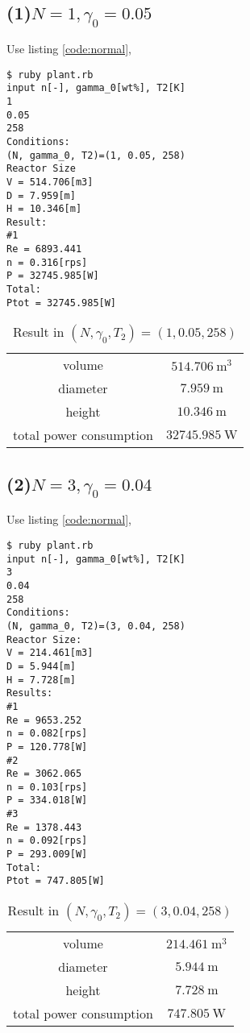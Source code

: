 \documentclass[a4paper,titlepage]{article}
\begin{document}
  \subsection*{(1)$N=1, \gamma_0=0.05$}
  Use listing \ref{code:normal},
  \begin{screen}
    \begin{verbatim}
$ ruby plant.rb
input n[-], gamma_0[wt%], T2[K]
1
0.05
258
Conditions:
(N, gamma_0, T2)=(1, 0.05, 258)
Reactor Size
V = 514.706[m3]
D = 7.959[m]
H = 10.346[m]
Result:
#1
Re = 6893.441
n = 0.316[rps]
P = 32745.985[W]
Total:
Ptot = 32745.985[W]\end{verbatim}
  \end{screen}

  \begin{table}[htbp]
    \centering
    \begin{tabular}{cc}\hline
      volume & $\SI{514.706}{\cubic\meter}$ \\
      diameter & $\SI{7.959}{\meter}$ \\
      height & $\SI{10.346}{\meter}$ \\
      total power consumption & $\SI{32745.985}{\watt}$ \\ \hline
    \end{tabular}
    \caption{Result in $(N, \gamma_0, T_2) = (1, 0.05, 258)$}
  \end{table}

\newpage

  \subsection*{(2)$N=3, \gamma_0=0.04$}
  Use listing \ref{code:normal},
  \begin{screen}
    \begin{verbatim}
$ ruby plant.rb
input n[-], gamma_0[wt%], T2[K]
3
0.04
258
Conditions:
(N, gamma_0, T2)=(3, 0.04, 258)
Reactor Size:
V = 214.461[m3]
D = 5.944[m]
H = 7.728[m]
Results:
#1
Re = 9653.252
n = 0.082[rps]
P = 120.778[W]
#2
Re = 3062.065
n = 0.103[rps]
P = 334.018[W]
#3
Re = 1378.443
n = 0.092[rps]
P = 293.009[W]
Total:
Ptot = 747.805[W]\end{verbatim}
  \end{screen}

  \begin{table}[htbp]
    \centering
    \begin{tabular}{cc}\hline
      volume & $\SI{214.461}{\cubic\meter}$ \\
      diameter & $\SI{5.944}{\meter}$ \\
      height & $\SI{7.728}{\meter}$ \\
      total power consumption & $\SI{747.805}{\watt}$ \\ \hline
    \end{tabular}
    \caption{Result in $(N, \gamma_0, T_2) = (3, 0.04, 258)$}
  \end{table}
\end{document}
